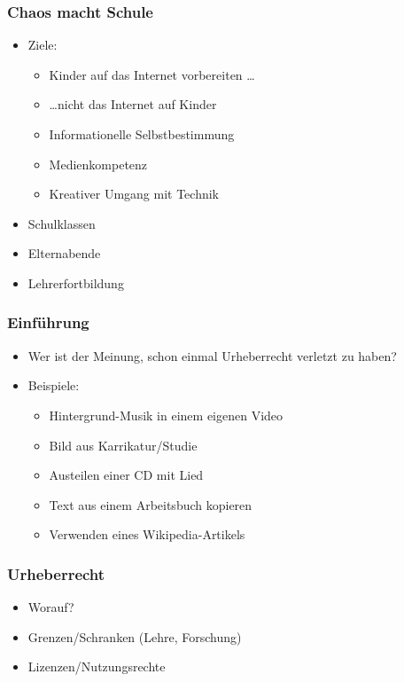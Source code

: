 \documentclass{beamer}
\begin{document}
\begin{frame}
    \frametitle{Chaos macht Schule}
    \begin{itemize}
        \item<2->Ziele:
            \begin{itemize}
                \item<3-> Kinder auf das Internet vorbereiten \ldots
                \item<4-> \ldots nicht das Internet auf Kinder
                \item<5-> Informationelle Selbstbestimmung
                \item<6-> Medienkompetenz
                \item<7-> Kreativer Umgang mit Technik
            \end{itemize}
        \item<8-> Schulklassen
        \item<9-> Elternabende
        \item<10-> Lehrerfortbildung
    \end{itemize}
\end{frame}

\begin{frame}
    \frametitle{Einführung}
    \begin{itemize}
        \item<2-> Wer ist der Meinung, schon einmal Urheberrecht verletzt zu haben?
        \item<3-> Beispiele:
        \begin{itemize}
          \item<2-> Hintergrund-Musik in einem eigenen Video
          \item<3-> Bild aus Karrikatur/Studie
          \item<4-> Austeilen einer CD mit Lied
          \item<5-> Text aus einem Arbeitsbuch kopieren
          \item<6-> Verwenden eines Wikipedia-Artikels
        \end{itemize}
    \end{itemize}
\end{frame}

\begin{frame}
    \frametitle{Urheberrecht}
    \begin{itemize}
        \item<2-> Worauf?
        \item<3-> Grenzen/Schranken (Lehre, Forschung)
        \item<4-> Lizenzen/Nutzungsrechte
    \end{itemize}
\end{frame}
\end{document}
